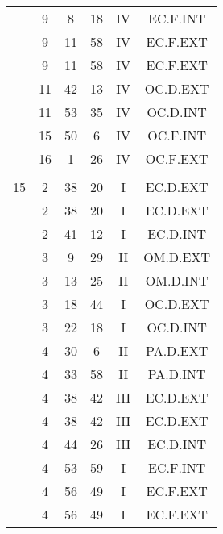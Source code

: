 \documentclass[12pt, a4paper]{article}
\begin{document}
\begin{multicols}{3}
{\begin{tabular}{c c c c c c}
	 	 	 	 & 9 & 8 & 18 & IV & EC.F.INT\\%
	 	 	 	 & 9 & 11 & 58 & IV & EC.F.EXT\\%
	 	 	 	 & 9 & 11 & 58 & IV & EC.F.EXT\\%
	 	 	 	 & 11 & 42 & 13 & IV & OC.D.EXT\\%
	 	 	 	 & 11 & 53 & 35 & IV & OC.D.INT\\%
	 	 	 	 & 15 & 50 & 6 & IV & OC.F.INT\\%
	 	 	 	 & 16 & 1 & 26 & IV & OC.F.EXT\\%
	 	 	 	 & & & & & \\%
	 	 	 	15 & 2 & 38 & 20 & I & EC.D.EXT\\%
	 	 	 	 & 2 & 38 & 20 & I & EC.D.EXT\\%
	 	 	 	 & 2 & 41 & 12 & I & EC.D.INT\\%
	 	 	 	 & 3 & 9 & 29 & II & OM.D.EXT\\%
	 	 	 	 & 3 & 13 & 25 & II & OM.D.INT\\%
	 	 	 	 & 3 & 18 & 44 & I & OC.D.EXT\\%
	 	 	 	 & 3 & 22 & 18 & I & OC.D.INT\\%
	 	 	 	 & 4 & 30 & 6 & II & PA.D.EXT\\%
	 	 	 	 & 4 & 33 & 58 & II & PA.D.INT\\%
	 	 	 	 & 4 & 38 & 42 & III & EC.D.EXT\\%
	 	 	 	 & 4 & 38 & 42 & III & EC.D.EXT\\%
	 	 	 	 & 4 & 44 & 26 & III & EC.D.INT\\%
	 	 	 	 & 4 & 53 & 59 & I & EC.F.INT\\%
	 	 	 	 & 4 & 56 & 49 & I & EC.F.EXT\\%
	 	 	 	 & 4 & 56 & 49 & I & EC.F.EXT\\%

\end{tabular}}
\end{multicols}
\end{document}
